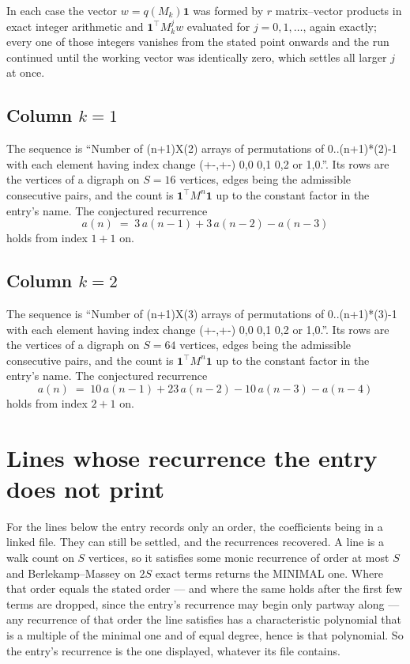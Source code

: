 \documentclass[11pt,a4paper]{article}
\theoremstyle{plain}
\theoremstyle{definition}
\begin{document}
In each case the vector $w=q(M_k)\mathbf{1}$ was formed by $r$ matrix--vector products in
exact integer arithmetic and $\mathbf{1}^{\!\top}M_k^{j}w$ evaluated for $j=0,1,\dots$,
again exactly; every one of those integers vanishes from the stated point onwards and the run
continued until the working vector was identically zero, which settles all larger $j$ at once.

\subsection*{Column $k$$=1$}
The sequence is ``Number of (n+1)X(2) arrays of permutations of 0..(n+1)*(2)-1 with each element having index change (+-,+-) 0,0 0,1 0,2 or 1,0.''. Its rows are the vertices of a digraph on
$S=16$ vertices, edges being the admissible consecutive pairs, and the count is
$\mathbf{1}^{\!\top}M^{n}\mathbf{1}$ up to the constant factor in the entry's name.
The conjectured recurrence
\[
a(n)\;=\;3\,a(n-1) + 3\,a(n-2) - a(n-3)
\]
holds from index $1+1$ on.

\subsection*{Column $k$$=2$}
The sequence is ``Number of (n+1)X(3) arrays of permutations of 0..(n+1)*(3)-1 with each element having index change (+-,+-) 0,0 0,1 0,2 or 1,0.''. Its rows are the vertices of a digraph on
$S=64$ vertices, edges being the admissible consecutive pairs, and the count is
$\mathbf{1}^{\!\top}M^{n}\mathbf{1}$ up to the constant factor in the entry's name.
The conjectured recurrence
\[
a(n)\;=\;10\,a(n-1) + 23\,a(n-2) - 10\,a(n-3) - a(n-4)
\]
holds from index $2+1$ on.


\section{Lines whose recurrence the entry does not print}

For the lines below the entry records only an order, the coefficients being in a linked file.
They can still be settled, and the recurrences recovered. A line is a walk count on $S$
vertices, so it satisfies some monic recurrence of order at most $S$ and Berlekamp--Massey on
$2S$ exact terms returns the MINIMAL one. Where that order equals the stated order --- and
where the same holds after the first few terms are dropped, since the entry's recurrence may
begin only partway along --- any recurrence of that order the line satisfies has a
characteristic polynomial that is a multiple of the minimal one and of equal degree, hence is
that polynomial. So the entry's recurrence is the one displayed, whatever its file contains.
\end{document}
